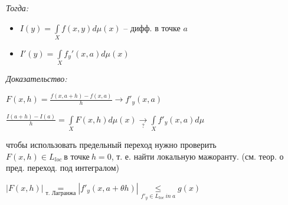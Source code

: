 \documentclass[paper=a4, fontsize=17pt]{article}
\begin{document}
\emph{Тогда:}
\begin{itemize}
	\item $ I(y) = \int\limits_{X} f(x, y) d\mu(x) $ -- дифф. в точке $ a $
	\item $ I'(y) = \int\limits_{X} f_y'(x, a) d\mu(x) $
\end{itemize}

\emph{Доказательство:}

	$ F(x, h) = \frac{f(x, a + h) - f(x, a)}{h} \rightarrow f'_y(x, a) $

	$ \frac{I(a + h) - I(a)}{h} = \int\limits_X F(x, h) d\mu(x)
	  \underset{?}{\rightarrow} \int\limits_X f'_y(x, a) d\mu$

	  чтобы использовать предельный переход нужно проверить
	  $ F(x, h) \in L_{loc} ~ \text{в точке} ~  h = 0 $, т. е. найти локальную мажоранту. (см. теор. о пред. переход. под интегралом)

	$ |F(x, h)| \underset{\text{т. Лагранжа}}{=}
	|f'_y(x, a + \theta h)| \underset{f'_y \in L_{loc} ~ in ~ a}{\leq} g(x) $
\end{document}
